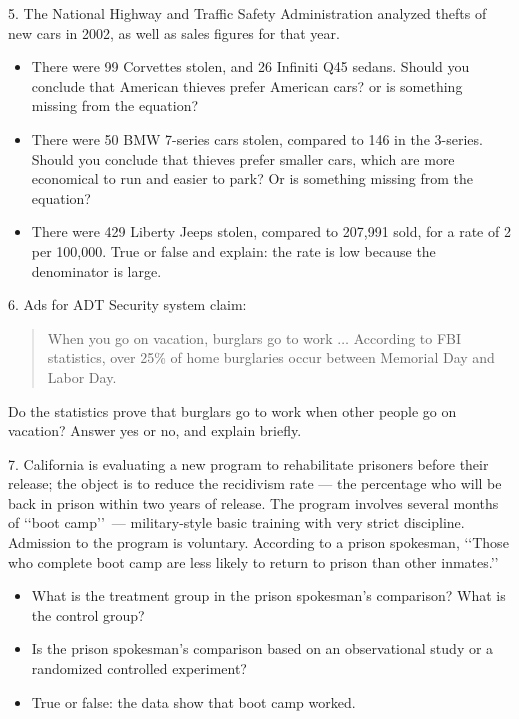 \documentclass[10pt]{article}
\begin{document}
5. The National Highway and Traffic Safety Administration analyzed thefts of new cars in 2002, as well 
as sales figures for that year.

\begin{itemize}
\item There were 99 Corvettes stolen, and 26 Infiniti Q45 sedans.  Should you conclude
that American thieves prefer American cars?  or is something missing from the equation?
\vspace{.45in}
%
\item There were 50 BMW 7-series cars stolen, compared to 146 in the 3-series.  Should you conclude 
that thieves prefer smaller cars, which are more
economical to run and easier to park?  Or is something missing from the equation?
\vspace{.45in}
%
\item There were 429 Liberty Jeeps stolen, compared to 207,991 sold, for a rate of 2 per 100,000.  
True or false and explain:  the rate is low because the denominator is large.
\end{itemize}

\vfill
\eject

6. Ads for ADT Security system claim:\vspace{-5pt}
\begin{quotation}
When you go on vacation, burglars go to work $\dots$ According to  FBI statistics, 
over 25\% of home burglaries occur between Memorial Day and Labor Day.\vspace{-5pt}
\end{quotation}
Do the statistics prove that burglars go to work when other people go on vacation?  
Answer yes or no, and explain briefly.
\vspace{.5in}

7. California is evaluating a new program to rehabilitate prisoners before their release;  the object is to reduce
the recidivism rate --- the percentage who will be back in prison within
two years of release.  The program involves several months of 
\lq\lq boot camp\rq\rq\ --- military-style basic training with very strict discipline.
Admission to the program is voluntary.  According to a prison spokesman, \lq\lq Those who complete
boot camp are less likely to return to prison than other inmates.\rq\rq\

\begin{itemize}
\item What is the treatment group in the prison spokesman's comparison?
What is the control group?
\vspace{.5in}
%
\item Is the prison spokesman's comparison based on an observational study  or
a randomized controlled experiment?
\vspace{.5in}
%
\item True or false:  the data show that boot camp worked.
\end{itemize}


\vfill
\eject
\end{document}
